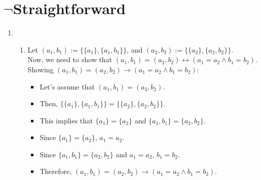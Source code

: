 \documentclass[a4paper]{article}
\begin{document}
\newpage
\section{$\neg$Straightforward}
    \begin{enumerate}
        \item \begin{enumerate}
            \item Let $(a_1, b_1) := \{\{ a_1\}, \{a_1, b_1 \}\}$, and $(a_2, b_2) := \{\{ a_2\}, \{a_2, b_2 \}\}$.\\
            
            Now, we need to show that $(a_1, b_1) = (a_2, b_2) \leftrightarrow (a_1 = a_2 \land b_1 = b_2)$.\\

            Showing $(a_1, b_1) = (a_2, b_2) \rightarrow (a_1 = a_2 \land b_1 = b_2)$:
            \begin{itemize}
                \item Let's assume that $(a_1, b_1) = (a_2, b_2)$.\\
                \item Then, $\{\{ a_1\}, \{a_1, b_1 \}\} = \{\{ a_2\}, \{a_2, b_2 \}\}$.\\
                \item This implies that $\{ a_1\} = \{ a_2\}$ and $\{a_1, b_1 \} = \{a_2, b_2 \}$.\\
                \item Since $\{ a_1\} = \{ a_2\}$, $a_1 = a_2$.\\
                \item Since $\{a_1, b_1 \} = \{a_2, b_2 \}$ and $a_1 = a_2$, $b_1 = b_2$.\\
                \item Therefore, $(a_1, b_1) = (a_2, b_2) \rightarrow (a_1 = a_2 \land b_1 = b_2)$.\\
            \end{itemize}


\end{enumerate}
\end{enumerate}
\end{document}
